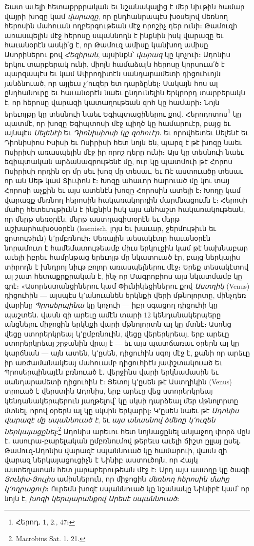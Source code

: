 \documentclass{article}
\begin{document}
{Շատ աւելի հետաքրքրական եւ նշանակալից է մեր նիւթին համար վայրի խոզը կամ \emph{վարազը}, որ ընդհանրապէս խօսելով մեռնող հերոսին մահուան ողբերգութեան մէջ որոշիչ դեր ունի։ Թամուզի առասպելին մէջ հերոսը սպաննողն է ինքնին իսկ վարազը եւ հաւանօրէն ասկի՛ց է, որ Թամուզ ամիսը կանխող ամիսը Ասորիներու քով \emph{Հեզիրան}, այսինքն՝ \emph{վարազ} կը կոչուի։ Ադոնիս երկու տարբերակ ունի, միոյն համաձայն հերոսը կորսուա՛ծ է պարզապէս եւ կամ Ափրոդիտէն սանդարամետի դիցուհւոյն յանձնուած, որ այլեւս չ՚ուզեր ետ դարձընել։ Սակայն հոս ալ ընդհանուրը եւ հաւանօրէն նաեւ ընդունելին երկրորդ տարբերակն է, որ հերոսը վարազի կատաղութեան զոհ կը համարի։ Նոյն երեւոյթը կը տեսնուի նաեւ Եգիպտացիներու քով․ Հերոդոտոս\footnote{Հերոդ․ 1, 2., 47։} կը պատմէ, որ խոզը Եգիպտոսի մէջ պիղծ կը համարուէր, բայց եւ այնպէս \emph{Սելենէի} եւ \emph{Դիոնիսիոսի կը զոհուէր}․ եւ որովհետեւ Սելենէ եւ Դիոնիսիոս Իսիսի եւ Ոսիրիսի հետ նոյն են, պարզ է թէ խոզը նաեւ Ոսիրիսի առասպելին մէջ իր որոշ դերը ունի։ Այս կը տեսնուի նաեւ եգիպտական արձանագրութենէ մը, ուր կը պատմուի թէ Հորոս Ոսիրիսի որդին օր մը սեւ խոզ մը տեսաւ, եւ Ռէ աստուածը տեսաւ որ ան Սեթ կամ Տիւփոն է։ Խոզը ահաւոր հարուած մը կու տայ Հորոսի աչքին եւ այս ատենէն խոզը Հորոսին ատելի է։ Խողը կամ վարազք մեռնող հերոսին հակառակորդին մարմնացումն է։ Հերոսի մահը հետեւութիւնն է ինքնին իսկ այս անհաշտ հակառակութեան, որ մերթ սեռօրէն, մերթ աստղագիտօրէն եւ մերթ աշխարհախօսօրէն (kosmisch, լոյս եւ խաւար, ջերմութիւն եւ ցրտութիւն) կ՚ըմբռնուի։ Սեռային աեսակէտը հաւանօրէն նորամուտ է համեմատութեամբ միւս երկուքին կամ թէ նախնաբար աւելի իբրեւ համընթաց երեւոյթ մը նկատուած էր, բայց ներկայիս տիրողն է խնդրոյ նիւթ բոլոր առասպելներու մէջ։ Երեք տեսակէտով ալ շատ հետաքրքրական է, ինչ որ Մագրոբիոս այս նկատմամբ կը գրէ։ «Ասորեստանցիներու կամ Փիւնիկեցիներու քով \emph{Աստղիկ} (Venus) դիցուհին — այսպէս կ՚անուանեն երկնքի վերի մթնոլորտը, մինչդեռ վարինը \emph{Պրոսերպինա} կը կոչուի — իբր սգացող դիցուհի կը պաշտեն․ վասն զի արեւը ամէն տարի 12 կենդանակերպերը անցնելու միջոցին երկնքի վարի մթնոլորտն ալ կը մտնէ։ Ասոնց վեցը ստորերկրեայ կ՚ըմբռնուին, վեցը վերերկրեայ, երբ արեւը ստորերկրեայ շրջանին վրայ է — եւ այս պատճառաւ օրերն ալ կը կարճնան — այն ատեն, կ՚ըսեն, դիցուհին սգոյ մէջ է, քանի որ արեւը իր առժամանակեայ մահուամբ դիցուհիէն յափշտակուած եւ Պրոսերպինայէն բռնուած է․ վերջինս վարի երկնամասին եւ սանդարամետի դիցուհին է։ Յետոյ կ՚ըսեն թէ Աստղիկին (Venus) տրուած է վերստին Ադոնիս, երբ արեւը վեց ստորերկրեայ կենդանակերպերուն յաղթելով՝ կը սկսի դարձեալ մեր մթնոլորտը մտնել, որով օրերն ալ կը սկսին երկարիլ։ Կ՚ըսեն նաեւ թէ \emph{Ադոնիս վարազէ մը սպաննուած է}, եւ \emph{այս անասնով ձմեռը կ՚ուզեն ներկայացընել}։\footnote{Macrobius Sat. 1. 21.} Ադոնիս արեւու հետ նոյնացընել անյաջող փորձ մըն է․ ասուրա֊բարելական ըմբռնումով թերեւս աւելի ճիշտ ըլլայ ըսել․ Թամուզ֊Ադոնիս վարազէ սպաննուած կը համարուի, վասն զի վարազ ներկայացուցիչն է Նինիբ աստուծոյն, որ Հայկ աստեղատան հետ յարաբերութեան մէջ է։ Արդ այս աստղը կը ծագի \emph{Յունիս}֊\emph{Յուլիս} ամիսներուն, որ միջոցին \emph{մեռնող հերոսին մահը կ՚ողբացուի}։ Ուրեմն խոզէ սպաննուած կը նշանակը Նինիբէ կամ՝ որ նոյն է, \emph{խոզի կերպարանքով Արեսէ սպաննուած}։

}
\end{document}
